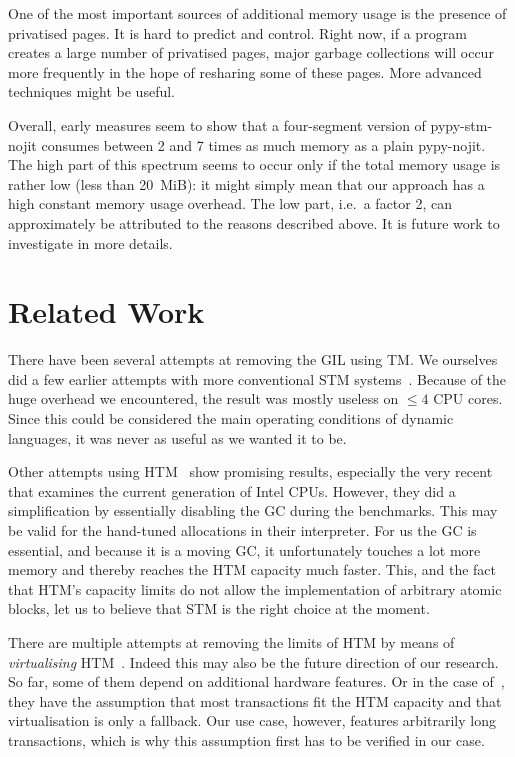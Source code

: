 \documentclass{sigplanconf}
\begin{document}
One of the most important sources of additional memory usage is the
presence of privatised pages.  It is hard to predict and control.
Right now, if a program creates a large number of privatised pages,
major garbage collections will occur more frequently in the hope of
resharing some of these pages.  More advanced techniques might be
useful.

Overall, early measures seem to show that a four-segment version of
pypy-stm-nojit consumes between 2 and 7 times as much memory as a
plain pypy-nojit.  The high part of this spectrum seems to occur only
if the total memory usage is rather low (less than 20~MiB): it might
simply mean that our approach has a high constant memory usage
overhead.  The low part, i.e.\ a factor 2, can approximately be
attributed to the reasons described above.  It is future work to
investigate in more details.



\section{Related Work}

There have been several attempts at removing the GIL using TM. We
ourselves did a few earlier attempts with more conventional STM
systems~\cite{stmupdate13}. Because of the huge overhead we
encountered, the result was mostly useless on $\le 4$ CPU cores.
Since this could be considered the main operating conditions of
dynamic languages, it was never as useful as we wanted it to be.

Other attempts using HTM~\cite{nicholas06,odaira14,fuad10} show
promising results, especially the very recent~\cite{odaira14} that
examines the current generation of Intel CPUs. However, they did a
simplification by essentially disabling the GC during the
benchmarks. This may be valid for the hand-tuned allocations in their
interpreter. For us the GC is essential, and because it is a moving
GC, it unfortunately touches a lot more memory and thereby reaches the
HTM capacity much faster.  This, and the fact that HTM's capacity
limits do not allow the implementation of arbitrary atomic blocks, let
us to believe that STM is the right choice at the moment.

There are multiple attempts at removing the limits of HTM by means of
\emph{virtualising} HTM~\cite{rajwar05,chung06}. Indeed this may also
be the future direction of our research. So far, some of them depend
on additional hardware features. Or in the case of~\cite{chung06},
they have the assumption that most transactions fit the HTM capacity
and that virtualisation is only a fallback. Our use case, however,
features arbitrarily long transactions, which is why this assumption
first has to be verified in our case.
\end{document}
